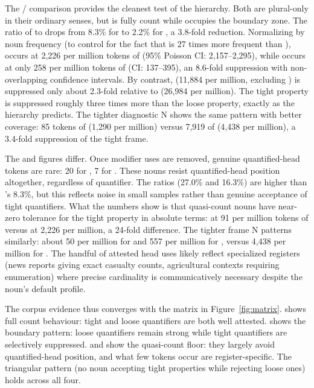 \documentclass[12pt,a4paper]{article}
\begin{document}
The / comparison provides the cleanest test of the hierarchy. Both are plural-only in their ordinary senses, but  is fully count while  occupies the boundary zone. The ratio of  to  drops from 8.3\% for  to 2.2\% for , a 3.8-fold reduction. Normalizing by noun frequency (to control for the fact that  is 27 times more frequent than ),  occurs at 2{,}226 per million tokens of  (95\% Poisson CI: 2{,}157--2{,}295), while  occurs at only 258 per million tokens of  (CI: 137--395), an 8.6-fold suppression with non-overlapping confidence intervals. By contrast,  (11{,}884 per million, excluding ) is suppressed only about 2.3-fold relative to  (26{,}984 per million). The tight property is suppressed roughly three times more than the loose property, exactly as the hierarchy predicts. The tighter diagnostic  N shows the same pattern with better coverage: 85 tokens of  (1{,}290 per million) versus 7{,}919 of  (4{,}438 per million), a 3.4-fold suppression of the tight frame.

The  and  figures differ. Once modifier uses are removed, genuine quantified-head tokens are rare: 20 for , 7 for . These nouns resist quantified-head position altogether, regardless of quantifier. The ratios (27.0\% and 16.3\%) are higher than 's 8.3\%, but this reflects noise in small samples rather than genuine acceptance of tight quantifiers. What the numbers show is that quasi-count nouns have near-zero tolerance for the tight property in absolute terms:  at 91 per million tokens of  versus  at 2{,}226 per million, a 24-fold difference. The tighter frame  N patterns similarly: about 50 per million for  and 557 per million for , versus 4{,}438 per million for . The handful of attested head uses likely reflect specialized registers (news reports giving exact casualty counts, agricultural contexts requiring enumeration) where precise cardinality is communicatively necessary despite the noun's default profile.

The corpus evidence thus converges with the matrix in Figure~\ref{fig:matrix}.  shows full count behaviour: tight and loose quantifiers are both well attested.  shows the boundary pattern: loose quantifiers remain strong while tight quantifiers are selectively suppressed.  and  show the quasi-count floor: they largely avoid quantified-head position, and what few tokens occur are register-specific. The triangular pattern (no noun accepting tight properties while rejecting loose ones) holds across all four.
\end{document}
